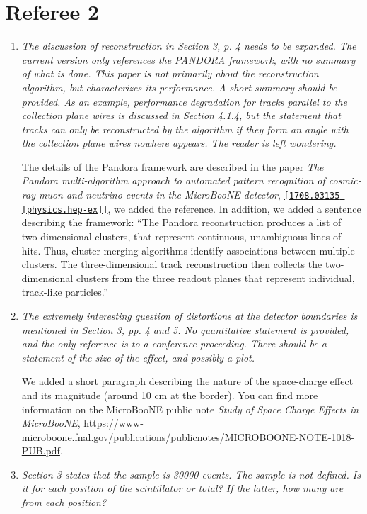 \documentclass[review,number,sort&compress]{article}
\begin{document}
\section{\bf Referee 2}

\begin{enumerate}
\item \emph{The discussion of reconstruction in Section 3, p. 4 needs to be expanded. The current version only references the PANDORA framework, with no summary of what is done. This paper is not primarily about the reconstruction algorithm, but characterizes its performance. A short summary should be provided. As an example, performance degradation for tracks parallel to the collection plane wires is discussed in Section 4.1.4, but the statement that tracks can only be reconstructed by the algorithm if they form an angle with the collection plane wires nowhere appears. The reader is left wondering.}

The details of the Pandora framework are described in the paper \textit{The Pandora multi-algorithm approach to automated pattern recognition of cosmic-ray muon and neutrino events in the MicroBooNE detector}, \href{https://arxiv.org/abs/1708.03135}{\texttt{[1708.03135 [physics.hep-ex]]}}, we added the reference. In addition, we added a sentence describing the framework: ``The Pandora reconstruction produces a list of two-dimensional clusters, that represent continuous, unambiguous lines of hits. Thus, cluster-merging algorithms identify associations between multiple clusters. The three-dimensional track reconstruction then collects the two-dimensional clusters from the three readout planes that represent individual, track-like particles.''

\item \emph{The extremely interesting question of distortions at the detector boundaries is mentioned in Section 3, pp. 4 and 5. No quantitative statement is provided, and the only reference is to a conference proceeding. There should be a statement of the size of the effect, and possibly a plot.}

We added a short paragraph describing the nature of the space-charge effect and its magnitude (around 10 cm at the border). You can find more information on the MicroBooNE public note \textit{Study of Space Charge Effects in MicroBooNE}, \url{https://www-microboone.fnal.gov/publications/publicnotes/MICROBOONE-NOTE-1018-PUB.pdf}.

\item \emph{Section 3 states that the sample is 30000 events. The sample is not defined. Is it for each position of the scintillator or total? If the latter, how many are from each position?}


\end{enumerate}
\end{document}
